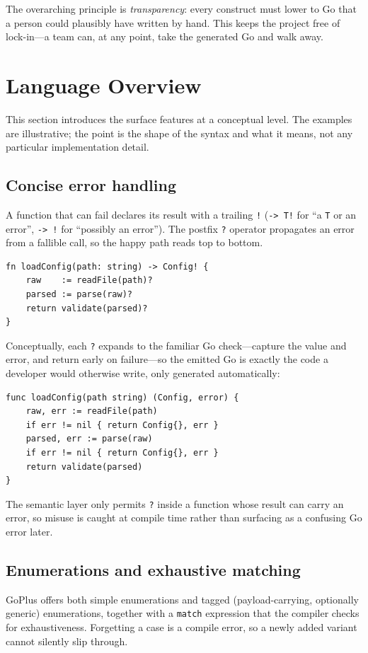 \documentclass[11pt,a4paper]{article}
\begin{document}
The overarching principle is \emph{transparency}: every construct must lower to
Go that a person could plausibly have written by hand. This keeps the project
free of lock-in---a team can, at any point, take the generated Go and walk away.

\section{Language Overview}
This section introduces the surface features at a conceptual level. The examples
are illustrative; the point is the shape of the syntax and what it means, not any
particular implementation detail.

\subsection{Concise error handling}
A function that can fail declares its result with a trailing \texttt{!}
(\texttt{-> T!} for ``a \texttt{T} or an error'', \texttt{-> !} for
``possibly an error''). The postfix \texttt{?} operator propagates an error from
a fallible call, so the happy path reads top to bottom.

\begin{lstlisting}[language=GoPlus,caption={Error propagation in GoPlus.}]
fn loadConfig(path: string) -> Config! {
    raw    := readFile(path)?
    parsed := parse(raw)?
    return validate(parsed)?
}
\end{lstlisting}

Conceptually, each \texttt{?} expands to the familiar Go check---capture the
value and error, and return early on failure---so the emitted Go is exactly the
code a developer would otherwise write, only generated automatically:

\begin{lstlisting}[language=Golang,caption={The Go that the previous example stands in for.}]
func loadConfig(path string) (Config, error) {
    raw, err := readFile(path)
    if err != nil { return Config{}, err }
    parsed, err := parse(raw)
    if err != nil { return Config{}, err }
    return validate(parsed)
}
\end{lstlisting}

The semantic layer only permits \texttt{?} inside a function whose result can
carry an error, so misuse is caught at compile time rather than surfacing as a
confusing Go error later.

\subsection{Enumerations and exhaustive matching}
GoPlus offers both simple enumerations and tagged (payload-carrying, optionally
generic) enumerations, together with a \texttt{match} expression that the
compiler checks for exhaustiveness. Forgetting a case is a compile error, so a
newly added variant cannot silently slip through.
\end{document}
